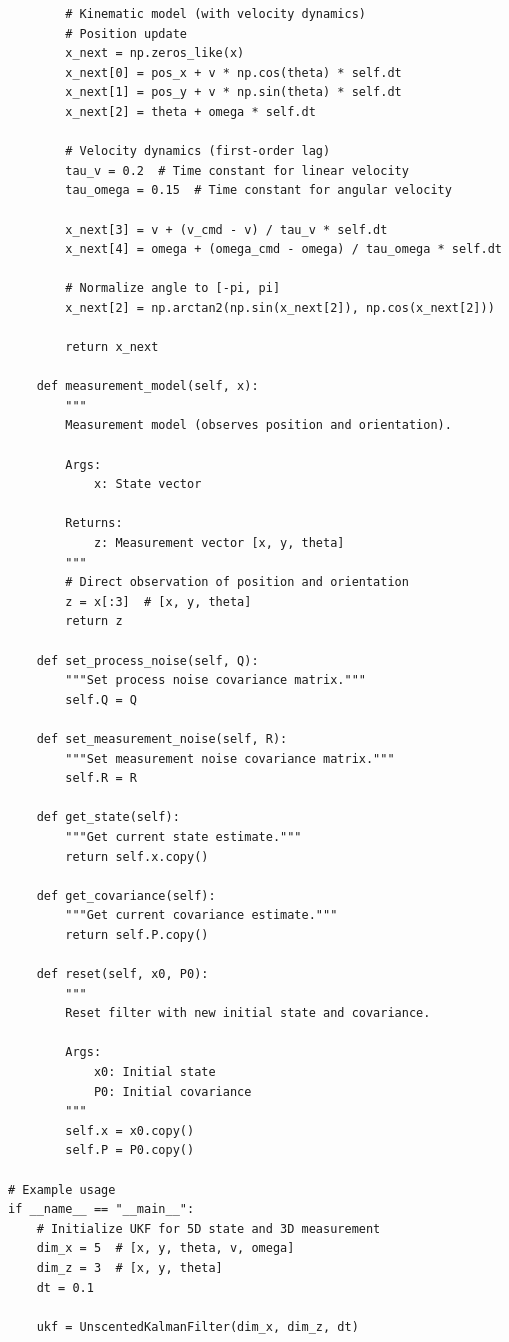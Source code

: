 \begin{lstlisting}
        # Kinematic model (with velocity dynamics)
        # Position update
        x_next = np.zeros_like(x)
        x_next[0] = pos_x + v * np.cos(theta) * self.dt
        x_next[1] = pos_y + v * np.sin(theta) * self.dt
        x_next[2] = theta + omega * self.dt
        
        # Velocity dynamics (first-order lag)
        tau_v = 0.2  # Time constant for linear velocity
        tau_omega = 0.15  # Time constant for angular velocity
        
        x_next[3] = v + (v_cmd - v) / tau_v * self.dt
        x_next[4] = omega + (omega_cmd - omega) / tau_omega * self.dt
        
        # Normalize angle to [-pi, pi]
        x_next[2] = np.arctan2(np.sin(x_next[2]), np.cos(x_next[2]))
        
        return x_next
    
    def measurement_model(self, x):
        """
        Measurement model (observes position and orientation).
        
        Args:
            x: State vector
            
        Returns:
            z: Measurement vector [x, y, theta]
        """
        # Direct observation of position and orientation
        z = x[:3]  # [x, y, theta]
        return z
    
    def set_process_noise(self, Q):
        """Set process noise covariance matrix."""
        self.Q = Q
    
    def set_measurement_noise(self, R):
        """Set measurement noise covariance matrix."""
        self.R = R
    
    def get_state(self):
        """Get current state estimate."""
        return self.x.copy()
    
    def get_covariance(self):
        """Get current covariance estimate."""
        return self.P.copy()
    
    def reset(self, x0, P0):
        """
        Reset filter with new initial state and covariance.
        
        Args:
            x0: Initial state
            P0: Initial covariance
        """
        self.x = x0.copy()
        self.P = P0.copy()

# Example usage
if __name__ == "__main__":
    # Initialize UKF for 5D state and 3D measurement
    dim_x = 5  # [x, y, theta, v, omega]
    dim_z = 3  # [x, y, theta]
    dt = 0.1
    
    ukf = UnscentedKalmanFilter(dim_x, dim_z, dt)
    

\end{lstlisting}
